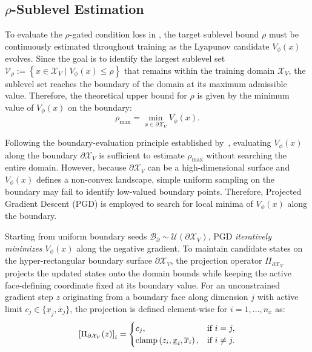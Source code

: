 \subsection{\texorpdfstring{$\rho$}{ρ}-Sublevel Estimation}
\label{subsec:rho-sublevel-estim}
To evaluate the $\rho$-gated condition loss in , the target sublevel bound $\rho$ 
must be continuously estimated throughout training as the Lyapunov candidate $V_\phi(x)$ evolves. 
Since the goal is to identify the largest sublevel set $\mathcal{V}_\rho := \left\{ x \in \mathcal{X}_V \mid V_\phi(x) \le \rho \right\}$ 
that remains within the training domain $\mathcal{X}_V$, the sublevel set reaches the boundary of the domain at 
its maximum admissible value. 
Therefore, the theoretical upper bound for $\rho$ is given by the minimum value of $V_\phi(x)$ on the boundary:
\begin{equation}
    \label{eq:rho-boundary-definition}
    \rho_{\mathrm{max}} = \min_{x \in \partial \mathcal{X}_V} V_\phi(x).
\end{equation}

Following the boundary-evaluation principle established by~\cite{yangLyapunovstableNeuralControl2024}, evaluating $V_\phi(x)$ 
along the boundary $\partial \mathcal{X}_V$ is sufficient to estimate $\rho_{\mathrm{max}}$ without searching the entire domain. 
However, because $\partial \mathcal{X}_V$ can be a high-dimensional surface and $V_\phi(x)$ defines a non-convex landscape, 
simple uniform sampling on the boundary may fail to identify low-valued boundary points. 
Therefore, Projected Gradient Descent (PGD) is employed to search for local minima of $V_\phi(x)$ along the boundary.

Starting from uniform boundary seeds $\mathcal{B}_{\partial} \sim \mathcal{U}(\partial \mathcal{X}_V)$, 
PGD \emph{iteratively minimizes} $V_\phi(x)$ along the negative gradient.
To maintain candidate states on the hyper-rectangular boundary surface $\partial\mathcal{X}_V$, 
the projection operator $\Pi_{\partial \mathcal{X}_V}$ projects the updated states onto the domain bounds 
while keeping the active face-defining coordinate fixed at its boundary value. 
For an unconstrained gradient step $z$ originating from a boundary face along dimension $j$ with active limit 
$c_j \in \{\underline{x}_j, \overline{x}_j\}$, the projection is defined element-wise for $i = 1, \dots, n_x$ as:
\begin{equation}
    \label{eq:boundary-projection}
    \left[ \Pi_{\partial \mathcal{X}_V}(z) \right]_i = 
    \begin{cases}
        c_j, & \text{if } i = j, \\
        \operatorname{clamp} \left(z_i, \underline{x}_i, \overline{x}_i\right), & \text{if } i \neq j.
    \end{cases}
\end{equation}

